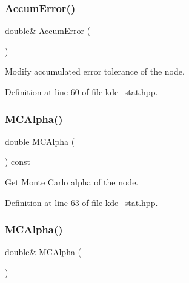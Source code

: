 \subsubsection{Accum\+Error()\hspace{0.1cm}{\footnotesize\ttfamily [2/2]}}
{\footnotesize\ttfamily double\& Accum\+Error (\begin{DoxyParamCaption}{ }\end{DoxyParamCaption})\hspace{0.3cm}{\ttfamily [inline]}}



Modify accumulated error tolerance of the node. 



Definition at line 60 of file kde\+\_\+stat.\+hpp.

\mbox{\label{classmlpack_1_1kde_1_1KDEStat_a6eeba0b6322d51e189693f8b6750d949}} 
\subsubsection{M\+C\+Alpha()\hspace{0.1cm}{\footnotesize\ttfamily [1/2]}}
{\footnotesize\ttfamily double M\+C\+Alpha (\begin{DoxyParamCaption}{ }\end{DoxyParamCaption}) const\hspace{0.3cm}{\ttfamily [inline]}}



Get Monte Carlo alpha of the node. 



Definition at line 63 of file kde\+\_\+stat.\+hpp.

\mbox{\label{classmlpack_1_1kde_1_1KDEStat_aced11fd0267dbf63565d068cc93f2374}} 
\subsubsection{M\+C\+Alpha()\hspace{0.1cm}{\footnotesize\ttfamily [2/2]}}
{\footnotesize\ttfamily double\& M\+C\+Alpha (\begin{DoxyParamCaption}{ }\end{DoxyParamCaption})\hspace{0.3cm}{\ttfamily [inline]}}




